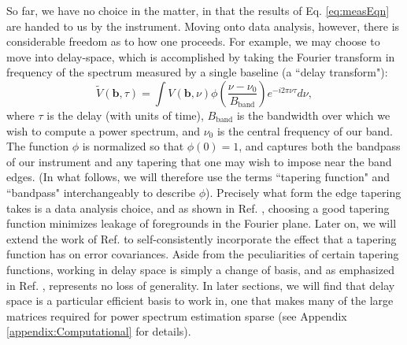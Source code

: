 \documentclass[twocolumn,aps,prd,nofootinbib,showpacs]{revtex4-1}
\begin{document}
So far, we have no choice in the matter, in that the results of  Eq. \eqref{eq:measEqn} are handed to us by the instrument.  Moving onto data analysis, however, there is considerable freedom as to how one proceeds.  For example, we may choose to move into delay-space, which is accomplished by taking the Fourier transform in frequency of the spectrum measured by a single baseline (a ``delay transform"):
\begin{equation}
\label{eq:DelayDef}
\widetilde{V} (\mathbf{b}, \tau) = \int V(\mathbf{b}, \nu) \phi \left( \frac{\nu - \nu_0}{B_\textrm{band}} \right) e^{-i 2 \pi \nu \tau} d\nu,
\end{equation}
where $\tau$ is the delay (with units of time), $B_\textrm{band}$ is the bandwidth over which we wish to compute a power spectrum, and $\nu_0$ is the central frequency of our band.  The function $\phi$ is normalized so that $\phi(0)=1$, and captures both the bandpass of our instrument and any tapering that one may wish to impose near the band edges.  (In what follows, we will therefore use the terms ``tapering function" and ``bandpass" interchangeably to describe $\phi$).  Precisely what form the edge tapering takes is a data analysis choice, and as shown in Ref. \cite{Thyagarajan2013}, choosing a good tapering function minimizes leakage of foregrounds in the Fourier plane.  Later on, we will extend the work of Ref. \cite{Thyagarajan2013} to self-consistently incorporate the effect that a tapering function has on error covariances.  Aside from the peculiarities of certain tapering functions, working in delay space is simply a change of basis, and as emphasized in Ref. \cite{Parsons2012b}, represents no loss of generality.  In later sections, we will find that delay space is a particular efficient basis to work in, one that makes many of the large matrices required for power spectrum estimation sparse (see Appendix \ref{appendix:Computational} for details).
\end{document}
